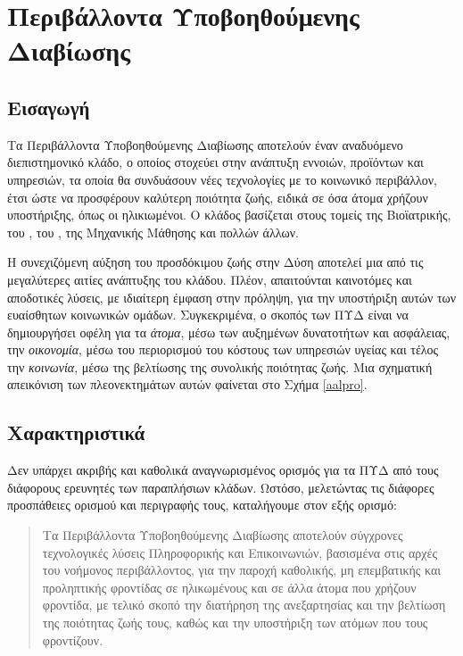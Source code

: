 \chapter{Περιβάλλοντα Υποβοηθούμενης Διαβίωσης}
\label{chap2}
\section{Εισαγωγή}
Τα Περιβάλλοντα Υποβοηθούμενης Διαβίωσης αποτελούν έναν αναδυόμενο διεπιστημονικό κλάδο, ο οποίος στοχεύει στην ανάπτυξη εννοιών, προϊόντων και υπηρεσιών, τα οποία θα συνδυάσουν νέες τεχνολογίες με το κοινωνικό περιβάλλον, έτσι ώστε να προσφέρουν καλύτερη ποιότητα ζωής, ειδικά σε όσα άτομα χρήζουν υποστήριξης, όπως οι ηλικιωμένοι.
Ο κλάδος βασίζεται στους τομείς της Βιοϊατρικής, του , του , της Μηχανικής Μάθησης και πολλών άλλων.
\par
Η συνεχιζόμενη αύξηση του προσδόκιμου ζωής στην Δύση αποτελεί μια από τις μεγαλύτερες αιτίες ανάπτυξης του κλάδου.
Πλέον, απαιτούνται καινοτόμες και αποδοτικές λύσεις, με ιδιαίτερη έμφαση στην πρόληψη, για την υποστήριξη αυτών των ευαίσθητων κοινωνικών ομάδων.
Συγκεκριμένα, ο σκοπός των ΠΥΔ είναι να δημιουργήσει οφέλη για τα \textit{άτομα}, μέσω των αυξημένων δυνατοτήτων και ασφάλειας, την \textit{οικονομία}, μέσω του περιορισμού του κόστους των υπηρεσιών υγείας και τέλος την \textit{κοινωνία}, μέσω της βελτίωσης της συνολικής ποιότητας ζωής. Μια σχηματική απεικόνιση των πλεονεκτημάτων αυτών φαίνεται στο Σχήμα \ref{aalpro}. 

\section{Χαρακτηριστικά}
Δεν υπάρχει ακριβής και καθολικά αναγνωρισμένος ορισμός για τα ΠΥΔ από τους διάφορους ερευνητές των παραπλήσιων κλάδων.
Ωστόσο, μελετώντας τις διάφορες προσπάθειες ορισμού και περιγραφής τους, καταλήγουμε στον εξής ορισμό:
\begin{quote}
    Τα Περιβάλλοντα Υποβοηθούμενης Διαβίωσης αποτελούν σύγχρονες τεχνολογικές λύσεις Πληροφορικής και Επικοινωνιών, βασισμένα στις αρχές του νοήμονος περιβάλλοντος, για την παροχή καθολικής, μη επεμβατικής και προληπτικής φροντίδας σε ηλικωμένους και σε άλλα άτομα που χρήζουν φροντίδα, με τελικό σκοπό την διατήρηση της ανεξαρτησίας και την βελτίωση της ποιότητας ζωής τους, καθώς και την υποστήριξη των ατόμων που τους φροντίζουν. 
\end{quote}

